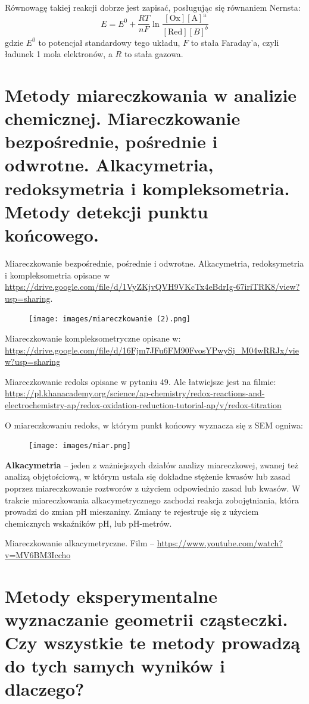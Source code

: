 \documentclass{article}
\begin{document}
Równowagę takiej reakcji dobrze jest zapisać, posługując się równaniem Nernsta:
\begin{equation*}
    E=E^0+\frac{RT}{nF}\ln{\frac{[\mathrm{Ox}]\mathrm{[A]^a}}{[\mathrm{Red}][B]^b}}
\end{equation*}
gdzie $E^0$ to potencjał standardowy tego układu, $F$ to stała Faraday'a, czyli ładunek 1 mola elektronów, a $R$ to stała gazowa.

\section{Metody miareczkowania w analizie chemicznej. Miareczkowanie bezpośrednie, pośrednie i odwrotne. Alkacymetria, redoksymetria i kompleksometria. Metody detekcji punktu końcowego.}
Miareczkowanie bezpośrednie, pośrednie i odwrotne. Alkacymetria, redoksymetria i kompleksometria opisane w \url{https://drive.google.com/file/d/1VyZKjvQVH9VKcTx4eBdrIg-67iriTRK8/view?usp=sharing}.

\begin{figure}[H]
    \centering
    \texttt{[image: images/miareczkowanie (2).png]}
\end{figure}

Miareczkowanie kompleksometryczne opisane w: \url{https://drive.google.com/file/d/16Fjm7JFu6FM90FvosYPwySj_M04wRRJx/view?usp=sharing}

Miareczkowanie redoks opisane w pytaniu 49. Ale łatwiejsze jest na filmie: \url{https://pl.khanacademy.org/science/ap-chemistry/redox-reactions-and-electrochemistry-ap/redox-oxidation-reduction-tutorial-ap/v/redox-titration}

O miareczkowaniu redoks, w którym punkt końcowy wyznacza się z SEM ogniwa:
\begin{figure}[H]
    \centering
    \texttt{[image: images/miar.png]}
\end{figure}

\textbf{Alkacymetria} – jeden z ważniejszych działów analizy miareczkowej, zwanej też analizą objętościową, w którym ustala się dokładne stężenie kwasów lub zasad poprzez miareczkowanie roztworów z użyciem odpowiednio zasad lub kwasów. W trakcie miareczkowania alkacymetrycznego zachodzi reakcja zobojętniania, która prowadzi do zmian pH mieszaniny. Zmiany te rejestruje się z użyciem chemicznych wskaźników pH, lub pH-metrów.

Miareczkowanie alkacymetryczne. Film -- \url{https://www.youtube.com/watch?v=MV6BM3Iccho}

\section{Metody eksperymentalne wyznaczanie geometrii cząsteczki. Czy wszystkie te metody prowadzą do tych samych wyników i dlaczego?}
\end{document}

